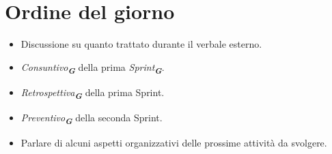 

\section{Ordine del giorno}

\begin{itemize}
    \item Discussione su quanto trattato durante il verbale esterno.
    \item \emph{Consuntivo}\textsubscript{\textit{\textbf{G}}} della prima \emph{Sprint}\textsubscript{\textit{\textbf{G}}}.
    \item \emph{Retrospettiva}\textsubscript{\textit{\textbf{G}}} della prima Sprint.
    \item \emph{Preventivo}\textsubscript{\textit{\textbf{G}}} della seconda Sprint.
    \item Parlare di alcuni aspetti organizzativi delle prossime attività da svolgere.
\end{itemize}